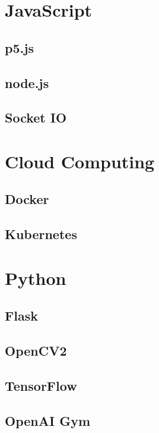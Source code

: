 
\section{JavaScript}
\subsection{p5.js}
\subsection {node.js}
\subsection{Socket IO}

\section{Cloud Computing}
\subsection{Docker}
\subsection{Kubernetes}


\section{Python}

\subsection{Flask}

\subsection{OpenCV2}

\subsection{TensorFlow}

\subsection{OpenAI Gym}
